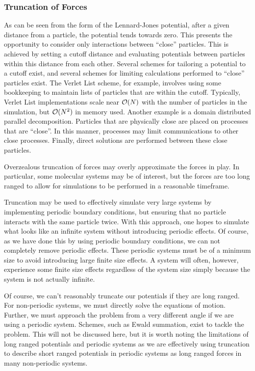 \subsubsection{Truncation of Forces}
%
As can be seen from the form of the Lennard-Jones potential,
after a given distance from a particle, the potential tends towards
zero.
%
This presents the opportunity to consider only interactions between
``close'' particles.
%
This is achieved by setting a cutoff distance and evaluating potentials
between particles within this distance from each other.
%
Several schemes for tailoring a potential to a cutoff exist, and several
schemes for limiting calculations performed to ``close'' particles
exist.
%
The Verlet List scheme, for example, involves using some bookkeeping to
maintain lists of particles that are within the cutoff.
%
Typically, Verlet List implementations scale near $\mathcal{O}{(N)}$ with the
number of particles in the simulation, but $\mathcal{O}{(N^2)}$ in memory used.
%
Another example is a domain distributed parallel decomposition.
%
Particles that are physically close are placed on processes that are ``close''.
%
In this manner, processes may limit communications to other close processes.
%
Finally, direct solutions are performed between these close particles.

%
Overzealous truncation of forces may overly approximate the forces in play.
%
In particular, some molecular systems may be of interest, but the forces
are too long ranged to allow for simulations to be performed in
a reasonable timeframe.

%
Truncation may be used to effectively simulate very large
systems by implementing periodic boundary conditions, but ensuring
that no particle interacts with the same particle twice.
%
With this approach, one hopes to simulate what looks like an infinite system
without introducing periodic effects.
%
Of course, as we have done this by using periodic boundary conditions,
we can not completely remove periodic effects.
%
These periodic systems must be of a minimum size to avoid introducing
large finite size effects.
%
A system will often, however, experience some finite size effects
regardless of the system size simply because the system is not actually
infinite.

%
Of course, we can't reasonably truncate our potentials if they are long ranged.
%
For non-periodic systems, we must directly solve the equations of motion.
%
Further, we must approach the problem from a very different angle if we
are using a periodic system.
%
Schemes, such as Ewald summation, exist to tackle the problem.
%
This will not be discussed here, but it is worth noting the limitations of
long ranged potentials and periodic systems as we are effectively using
truncation to describe short ranged potentials in periodic systems as
long ranged forces in many non-periodic systems.



